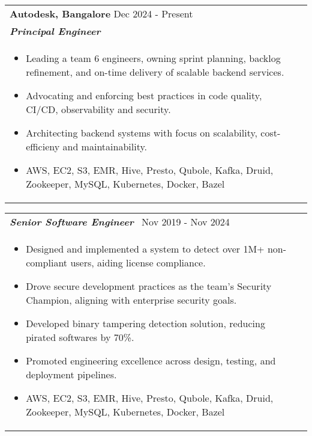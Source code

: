 \documentclass[a4paper,10pt]{article}
\begin{document}
\begin{tabularx}{\linewidth}{ @{}l r@{} }
\textbf{{Autodesk, Bangalore}} \hfill \color[HTML]{371e77} Dec 2024 - Present \\[4pt]
\color[HTML]{371e77}\textbf{\textit{Principal Engineer}}\ \hfill \color[HTML]{4B28A4} \\[5pt]
\begin{minipage}[t]{\linewidth}
    \begin{itemize}[nosep,after=\strut, leftmargin=2em, itemsep=2pt]
        \item Leading a team 6 engineers, owning sprint planning, backlog refinement, and on-time delivery of scalable backend services.
        \item Advocating and enforcing best practices in code quality, CI/CD, observability and security.
        \item Architecting backend systems with focus on scalability, cost-efficieny and maintainability.
        \item AWS, EC2, S3, EMR, Hive, Presto, Qubole, Kafka, Druid, Zookeeper, MySQL, Kubernetes, Docker, Bazel
    \end{itemize}
\end{minipage}
\end{tabularx}

\begin{tabularx}{\linewidth}{ @{}l r@{} }
\color[HTML]{371e77}\textbf{\textit{Senior Software Engineer}}\ \hfill \color[HTML]{4B28A4} Nov 2019 - Nov 2024\\[5pt]
\begin{minipage}[t]{\linewidth}
    \begin{itemize}[nosep,after=\strut, leftmargin=2em, itemsep=2pt]
        \item Designed and implemented a system to detect over 1M+ non-compliant users, aiding license compliance.
        \item Drove secure development practices as the team's Security Champion, aligning with enterprise security goals.
        \item Developed binary tampering detection solution, reducing pirated softwares by 70\%.
        \item Promoted engineering excellence across design, testing, and deployment pipelines.
        \item AWS, EC2, S3, EMR, Hive, Presto, Qubole, Kafka, Druid, Zookeeper, MySQL, Kubernetes, Docker, Bazel
    \end{itemize}
\end{minipage}
\end{tabularx}
\end{document}
